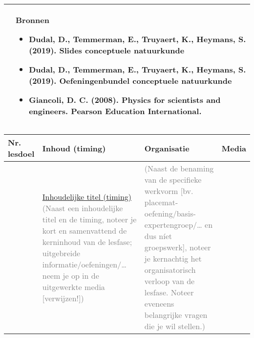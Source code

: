 \begin{landscape}
\begin{tabularx}{1.56\textwidth}{|p{}|X|}
		\\ \cline{2-2}
		  & \textbf{Bronnen}\begin{itemize}
		  	\item Dudal, D., Temmerman, E., Truyaert, K., Heymans, S. (2019). Slides conceptuele natuurkunde
		  	\item Dudal, D., Temmerman, E., Truyaert, K., Heymans, S. (2019). Oefeningenbundel conceptuele natuurkunde
		  	\item Giancoli, D. C. (2008). Physics for scientists and engineers. Pearson Education International.
		  \end{itemize}\\ \hline
	\end{tabularx}


\newpage
	
	
	
	\begin{tabularx}{1.56\textwidth}{|p{1.5cm}|p{6cm}|X|p{4cm}|}
		\hline
		\textbf{Nr. lesdoel } & \textbf{Inhoud (timing)}  & \textbf{Organisatie } & \textbf{Media } \\ \hline
		&\underline{Inhoudelijke titel (timing)}
	    \textcolor{gray}{(Naast een inhoudelijke titel en de timing, noteer je kort en samenvattend de kerninhoud van de lesfase; uitgebreide informatie/oefeningen/… neem je op in de uitgewerkte media [verwijzen!])}
	    &  \textcolor{gray}{(Naast de benaming van de specifieke werkvorm [bv. placemat-oefening/basis-expertengroep/… en dus níet groepswerk], noteer je kernachtig het organisatorisch verloop van de lesfase. Noteer eveneens belangrijke vragen die je wil stellen.) }
		& 
		\\ \hline
	\end{tabularx}
	
	
	
	
	
	
	
	
\end{landscape}